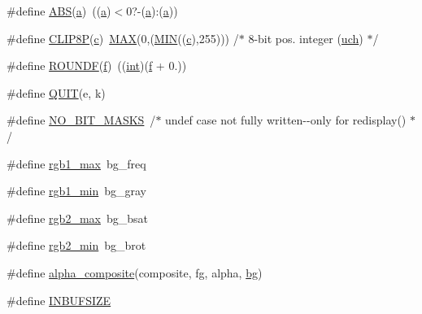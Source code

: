 \begin{DoxyCompactItemize}
\item 
\#define \mbox{\hyperlink{rpng2-x_8c_ae2f08dc603ae93c402abd918ba4e23e1}{A\+BS}}(\mbox{\hyperlink{isa-lr35902_8c_a7015284d2957ab7cdf82d2535a2fa547}{a}})~((\mbox{\hyperlink{isa-lr35902_8c_a7015284d2957ab7cdf82d2535a2fa547}{a}})$<$0?-\/(\mbox{\hyperlink{isa-lr35902_8c_a7015284d2957ab7cdf82d2535a2fa547}{a}})\+:(\mbox{\hyperlink{isa-lr35902_8c_a7015284d2957ab7cdf82d2535a2fa547}{a}}))
\item 
\#define \mbox{\hyperlink{rpng2-x_8c_a59dbc34417cea1957b04dbd47534fbaa}{C\+L\+I\+P8P}}(\mbox{\hyperlink{isa-lr35902_8c_ab27f9f98dd173bfc694f5d161e839d6e}{c}})~\mbox{\hyperlink{sqlite3_8c_ad935f1ff1a50822e317bdb321ce991ad}{M\+AX}}(0,(\mbox{\hyperlink{sqlite3_8c_adcd021ac91d43a62b2cdecf9a5b971a7}{M\+IN}}((\mbox{\hyperlink{isa-lr35902_8c_ab27f9f98dd173bfc694f5d161e839d6e}{c}}),255)))   /$\ast$ 8-\/bit pos. integer (\mbox{\hyperlink{readpng_8h_af3307af5922c72924a837559c801a8a4}{uch}}) $\ast$/
\item 
\#define \mbox{\hyperlink{rpng2-x_8c_afecc38967871feedc120e1d3650d387e}{R\+O\+U\+N\+DF}}(\mbox{\hyperlink{isa-arm_8c_a362077c979b0bb65159c603270e40f70}{f}})~((\mbox{\hyperlink{ioapi_8h_a787fa3cf048117ba7123753c1e74fcd6}{int}})(\mbox{\hyperlink{isa-arm_8c_a362077c979b0bb65159c603270e40f70}{f}} + 0.))
\item 
\#define \mbox{\hyperlink{rpng2-x_8c_ad76830d9084202349fd77f494a991ce4}{Q\+U\+IT}}(e,  k)
\item 
\#define \mbox{\hyperlink{rpng2-x_8c_a17b2fe83e2965ffad1ae90c4283b3034}{N\+O\+\_\+B\+I\+T\+\_\+\+M\+A\+S\+KS}}~/$\ast$ undef case not fully written-\/-\/only for redisplay() $\ast$/
\item 
\#define \mbox{\hyperlink{rpng2-x_8c_a2fff10e39e5f260c02e0d3ca6f0d0767}{rgb1\+\_\+max}}~bg\+\_\+freq
\item 
\#define \mbox{\hyperlink{rpng2-x_8c_a296f60be08dd0f77ffa8567145fb420b}{rgb1\+\_\+min}}~bg\+\_\+gray
\item 
\#define \mbox{\hyperlink{rpng2-x_8c_a302c6a6f0caef8546ccf8d25e2ba0217}{rgb2\+\_\+max}}~bg\+\_\+bsat
\item 
\#define \mbox{\hyperlink{rpng2-x_8c_a9de071f4fad1348f0344e55ab384f2a3}{rgb2\+\_\+min}}~bg\+\_\+brot
\item 
\#define \mbox{\hyperlink{rpng2-x_8c_af1fe887e7346a25e71f3b1527e723692}{alpha\+\_\+composite}}(composite,  fg,  alpha,  \mbox{\hyperlink{rpng2-x_8c_a808fa6d3573a86afa3ba7698a65b1ef6}{bg}})
\item 
\#define \mbox{\hyperlink{rpng2-x_8c_ab3f00dac33458432279d4308226d8413}{I\+N\+B\+U\+F\+S\+I\+ZE}}
\end{DoxyCompactItemize}

